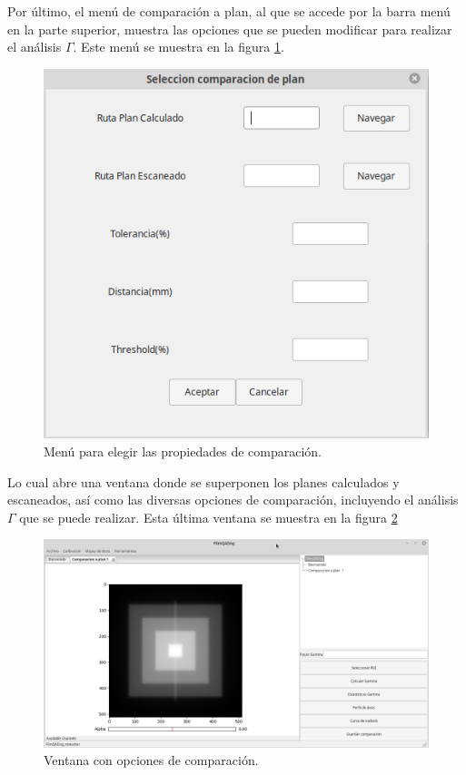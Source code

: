 Por último, el menú de comparación a plan, al que se accede por la barra menú en la parte superior, muestra las opciones que se pueden modificar para realizar el análisis $\Gamma$. Este menú se muestra en la figura \ref{fig:menuComparacion}.

\begin{figure}[H]
	\centering
	\includegraphics[width=0.7\linewidth]{images/imagenesDocumentacion/menuComparacionAplan.png}
	\caption{Menú para elegir las propiedades de comparación. }
	\label{fig:menuComparacion}
\end{figure}

Lo cual abre una ventana donde se superponen los planes calculados y escaneados, así como las diversas opciones de comparación, incluyendo el análisis $\Gamma$ que se puede realizar. Esta última ventana se muestra en la figura \ref{fig:ventanaComparacion}

\begin{figure}[H]
	\centering
	\includegraphics[width=0.7\linewidth]{images/imagenesDocumentacion/ventanaComparacioAPlan.png}
	\caption{Ventana con opciones de comparación. }
	\label{fig:ventanaComparacion}
\end{figure}

